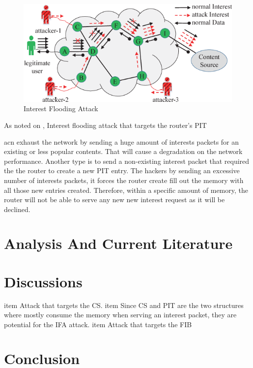 \documentclass[twocolumn]{article}
\begin{document}
\begin{figure} [ht]
    \centering
    \includegraphics[width=\columnwidth]{IFA.png}
    \caption{\small Interest Flooding Attack  \cite{Xin2016ANI} }
    \label{fig:my_label2}
\end{figure}

As noted on \cite{Gasti2013}, Interest flooding attack that targets the router's PIT



acn exhaust the network by sending a huge amount of interests packets for an existing or less popular contents. That will cause a degradation on the network performance. Another type is to send a non-existing interest packet that required the the router to create a new PIT entry. The hackers by sending an excessive number of interests packets, it forces the router create fill out the memory with all those new entries created. Therefore, within a specific amount of memory, the router will not be able to serve any new new interest request as it will be declined.\cite{KARAMI20151262}       

\section{Analysis And Current Literature}
\cite{Tourani2018}
\cite{Bhattacharyya2018}
\cite{Chhetry2016}
\cite{Abdallah2015}
\cite{Chen2015}
\cite{Gasti2013}
\cite{Zhang:2014:NDN:2656877.2656887}
\cite{Compagno2013}
\cite{Dai2013MitigateDA}
\cite{6496396}
\cite{Xin2016ANI}
\cite{Chhetry2016}
\cite{Nguyen2015}
\cite{8247232}
\cite{Zhao2018}
\cite{8352953}
\cite{8452848}

\section{Discussions}

\cite{Abdallah2015}
\cite{Chen2015}
\cite{Smetters2009}
\cite{Ahlgren2012}
\cite{Universite2018}

    item Attack that targets the CS.
    item Since CS and PIT are the two structures where mostly consume the memory when serving an interest packet, they are potential for the IFA attack. 
    item Attack that targets the FIB 

\section{Conclusion}






\end{document}
